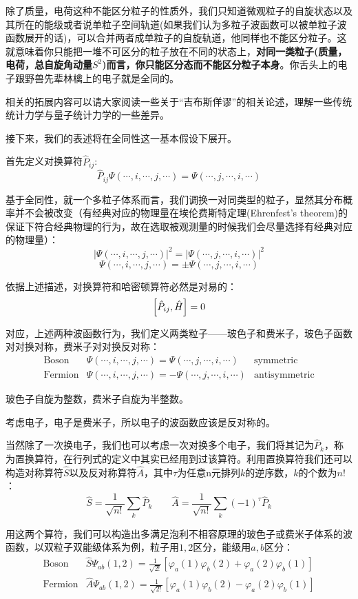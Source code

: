 除了质量，电荷这种不能区分粒子的性质外，我们只知道微观粒子的自旋状态以及其所在的能级或者说单粒子空间轨道(如果我们认为多粒子波函数可以被单粒子波函数展开的话)，可以合并两者成单粒子的自旋轨道，他同样也不能区分粒子。这就意味着你只能把一堆不可区分的粒子放在不同的状态上，\textbf{对同一类粒子(质量，电荷，总自旋角动量$S^2$)而言，你只能区分态而不能区分粒子本身}。你舌头上的电子跟野兽先辈林檎上的电子就是全同的。

相关的拓展内容可以请大家阅读一些关于“吉布斯佯谬”的相关论述，理解一些传统统计力学与量子统计力学的一些差异。

接下来，我们的表述将在全同性这一基本假设下展开。

首先定义对换算符$\hat{P}_{ij}$:
\[\hat{P}_{ij}\varPsi(\cdots,i,\cdots,j,\cdots)=\varPsi(\cdots,j,\cdots,i,\cdots)\]

基于全同性，就一个多粒子体系而言，我们调换一对同类型的粒子，显然其分布概率并不会被改变（有经典对应的物理量在埃伦费斯特定理(Ehrenfest's theorem)的保证下符合经典物理的行为，故在选取被观测量的时候我们会尽量选择有经典对应的物理量）：
\[|\varPsi(\cdots,i,\cdots,j,\cdots)|^2=|\varPsi(\cdots,j,\cdots,i,\cdots)|^2\]
\[\varPsi(\cdots,i,\cdots,j,\cdots)=\pm\varPsi(\cdots,j,\cdots,i,\cdots)\]

依据上述描述，对换算符和哈密顿算符必然是对易的：
\[\qty[\hat{P}_{ij},\hat{H}]=0\]

对应，上述两种波函数行为，我们定义两类粒子——玻色子和费米子，玻色子函数对对换对称，费米子对对换反对称：
\[
    \begin{array}{lll}
        \text{Boson} & \varPsi(\cdots,i,\cdots,j,\cdots)=\varPsi(\cdots,j,\cdots,i,\cdots) & \text{symmetric} \\
        \text{Fermion} & \varPsi(\cdots,i,\cdots,j,\cdots)=-\varPsi(\cdots,j,\cdots,i,\cdots) & \text{antisymmetric}
    \end{array}
\]

玻色子自旋为整数，费米子自旋为半整数。

考虑电子，电子是费米子，所以电子的波函数应该是反对称的。

当然除了一次换电子，我们也可以考虑一次对换多个电子，我们将其记为$\hat{P}_k$，称为置换算符，在行列式的定义中其实已经用到过该算符。利用置换算符我们还可以构造对称算符$\hat{S}$以及反对称算符$\hat{A}$，其中$\tau$为任意n元排列$k$的逆序数，$k$的个数为$n!$：
\[\hat{S}=\frac{1}{\sqrt{n!}}\sum_{k}\hat{P}_{k} \qquad \hat{A}=\frac{1}{\sqrt{n!}}\sum_{k}(-1)^{\tau}\hat{P}_{k}\]

用这两个算符，我们可以构造出多满足泡利不相容原理的玻色子或费米子体系的波函数，以双粒子双能级体系为例，粒子用$1,2$区分，能级用$a,b$区分：
\[
    \begin{array}{ll}
        \text{Boson} & \hat{S}\varPsi_{ab}(1,2)=\frac{1}{\sqrt{2!}}[\varphi_a(1)\varphi_b(2)+\varphi_a(2)\varphi_b(1)]\\
        \text{Fermion} & \hat{A}\varPsi_{ab}(1,2)=\frac{1}{\sqrt{2!}}[\varphi_a(1)\varphi_b(2)-\varphi_a(2)\varphi_b(1)] 
    \end{array}
\]

